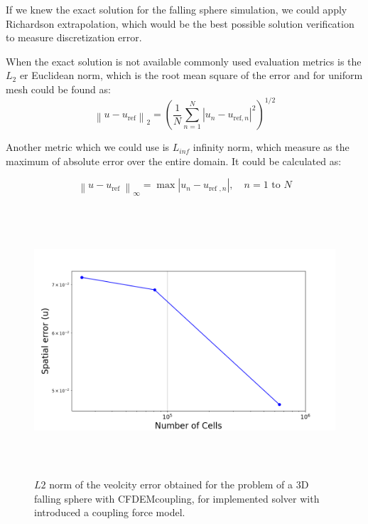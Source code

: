 If we knew the exact solution for the falling sphere simulation, we could apply Richardson extrapolation, which would be the best possible solution verification to measure discretization error.

When the exact solution is not available commonly used evaluation metrics \cite{oberkampf} is the $L_2$ er Euclidean norm, which is the root mean square of the error and for uniform mesh could be found as:
\begin{equation}
\left\|u-u_{\mathrm{ref}}\right\|_2=\left(\frac{1}{N} \sum_{n=1}^N\left|u_n-u_{\mathrm{ref}, n}\right|^2\right)^{1 / 2}
\end{equation}

Another metric which we could use is $L_{inf}$ infinity norm, which measure as the maximum of absolute error over the entire domain. It could be calculated as:

\begin{equation}
\left\|u-u_{\text {ref }}\right\|_{\infty}=\max \left|u_n-u_{\text {ref }, n}\right|, \quad n=1 \text { to } N
\end{equation}


\begin{figure}[!ht]
    \centering
    \includegraphics[width=16cm, height = 10cm]{ GWU_Thesis_Sarmakeeva/Images/chap3/l2_norm.png}
    \caption{$L2$ norm of the veolcity error obtained for the problem of a 3D falling sphere with CFDEMcoupling, for implemented solver with introduced a coupling force model.}
    \label{fig:l2}
\end{figure}

